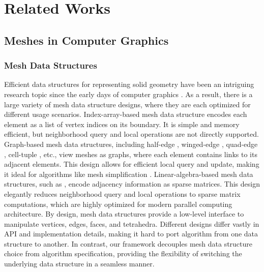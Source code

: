 \chapter{Related Works}
\label{sec:related}


\section{Meshes in Computer Graphics}
\subsection{Mesh Data Structures}

Efficient data structures for representing solid geometry have been an intriguing
research topic since the early days of computer graphics \cite{Requicha1980}. As
a result, there is a large variety of mesh data structure designs, where they
are each optimized for different usage scenarios. Index-array-based mesh data
structure encodes each element as a list of vertex indices on its
boundary.  It is simple and memory efficient, but neighborhood query and local
operations are not directly supported.
Graph-based mesh data structures, including half-edge \cite{Maentylae1987},
winged-edge \cite{Baumgart1972}, quad-edge \cite{Guibas1985}, cell-tuple
\cite{Brisson1989}, etc., view meshes as graphs, where each element contains
links to its adjacent elements. This design allows for efficient local query
and update, making it ideal for algorithms like mesh simplification
\cite{garland1997surface}. Linear-algebra-based mesh data structures, such as
\cite{Dicarlo2014,Zayer2017,Mahmoud2021}, encode adjacency information as sparse
matrices.  This design elegantly reduces neighborhood query and local operations
to sparse matrix computations, which are highly optimized for modern parallel
computing architecture. 
%
By design, mesh data structures provide a low-level interface to
manipulate vertices, edges, faces, and tetrahedra.
Different designs differ vastly in API and implementation details, making it hard to port algorithm from one data structure to another. In contrast, our framework decouples mesh data structure choice from algorithm specification, providing the flexibility of switching the underlying data structure in a seamless manner.


